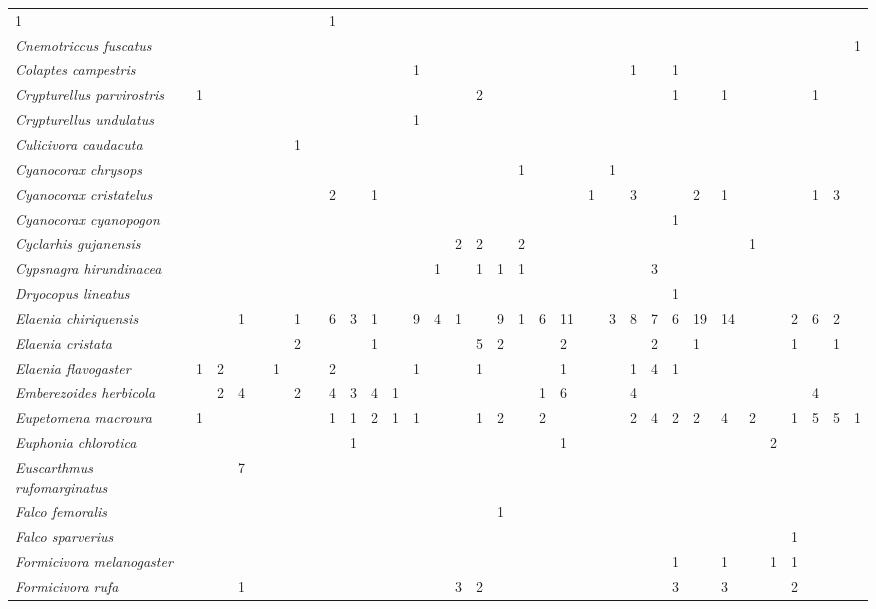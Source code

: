 \begin{longtable}[c]{@{}lllllllllllllllllllllllllllllllll@{}}
1 & & & & & & & & 1 & &\tabularnewline
\emph{Cnemotriccus fuscatus} & & & & & & & & & & & & & & & & & & & & & &
& & & & & & & & & & 1\tabularnewline
\emph{Colaptes campestris} & & & & & & & & & & & & 1 & & & & & & & & & &
1 & & 1 & & & & & & & &\tabularnewline
\emph{Crypturellus parvirostris} & 1 & & & & & & & & & & & & & & 2 & & &
& & & & & & 1 & & 1 & & & & 1 & &\tabularnewline
\emph{Crypturellus undulatus} & & & & & & & & & & & & 1 & & & & & & & &
& & & & & & & & & & & &\tabularnewline
\emph{Culicivora caudacuta} & & & & & & 1 & & & & & & & & & & & & & & &
& & & & & & & & & & &\tabularnewline
\emph{Cyanocorax chrysops} & & & & & & & & & & & & & & & & & 1 & & & & 1
& & & & & & & & & & &\tabularnewline
\emph{Cyanocorax cristatelus} & & & & & & & & 2 & & 1 & & & & & & & & &
& 1 & & 3 & & & 2 & 1 & & & & 1 & 3 &\tabularnewline
\emph{Cyanocorax cyanopogon} & & & & & & & & & & & & & & & & & & & & & &
& & 1 & & & & & & & &\tabularnewline
\emph{Cyclarhis gujanensis} & & & & & & & & & & & & & & 2 & 2 & & 2 & &
& & & & & & & & 1 & & & & &\tabularnewline
\emph{Cypsnagra hirundinacea} & & & & & & & & & & & & & 1 & & 1 & 1 & 1
& & & & & & 3 & & & & & & & & &\tabularnewline
\emph{Dryocopus lineatus} & & & & & & & & & & & & & & & & & & & & & & &
& 1 & & & & & & & &\tabularnewline
\emph{Elaenia chiriquensis} & & & 1 & & & 1 & & 6 & 3 & 1 & & 9 & 4 & 1
& & 9 & 1 & 6 & 11 & & 3 & 8 & 7 & 6 & 19 & 14 & & & 2 & 6 & 2
&\tabularnewline
\emph{Elaenia cristata} & & & & & & 2 & & & & 1 & & & & & 5 & 2 & & & 2
& & & & 2 & & 1 & & & & 1 & & 1 &\tabularnewline
\emph{Elaenia flavogaster} & 1 & 2 & & & 1 & & & 2 & & & & 1 & & & 1 & &
& & 1 & & & 1 & 4 & 1 & & & & & & & &\tabularnewline
\emph{Emberezoides herbicola} & & 2 & 4 & & & 2 & & 4 & 3 & 4 & 1 & & &
& & & & 1 & 6 & & & 4 & & & & & & & & 4 & &\tabularnewline
\emph{Eupetomena macroura} & 1 & & & & & & & 1 & 1 & 2 & 1 & 1 & & & 1 &
2 & & 2 & & & & 2 & 4 & 2 & 2 & 4 & 2 & & 1 & 5 & 5 & 1\tabularnewline
\emph{Euphonia chlorotica} & & & & & & & & & 1 & & & & & & & & & & 1 & &
& & & & & & & 2 & & & &\tabularnewline
\emph{Euscarthmus rufomarginatus} & & & 7 & & & & & & & & & & & & & & &
& & & & & & & & & & & & & &\tabularnewline
\emph{Falco femoralis} & & & & & & & & & & & & & & & & 1 & & & & & & & &
& & & & & & & &\tabularnewline
\emph{Falco sparverius} & & & & & & & & & & & & & & & & & & & & & & & &
& & & & & 1 & & &\tabularnewline
\emph{Formicivora melanogaster} & & & & & & & & & & & & & & & & & & & &
& & & & 1 & & 1 & & 1 & 1 & & &\tabularnewline
\emph{Formicivora rufa} & & & 1 & & & & & & & & & & & 3 & 2 & & & & & &
& & & 3 & & 3 & & & 2 & & &\tabularnewline

\end{longtable}
